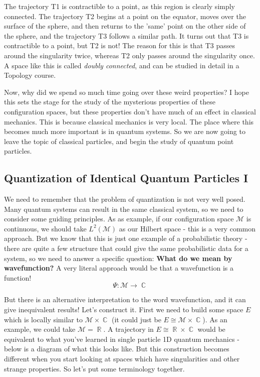 \documentclass{article}
\DeclareMathOperator{\RR}{\mathbb{R}}
\DeclareMathOperator{\CC}{\mathbb{C}}
\begin{document}
The trajectory T1 is contractible to a point, as this region is clearly simply connected. The trajectory T2 begins at a point on the equator, moves over the surface of the sphere, and then returns to the 'same' point on the other side of the sphere, and the trajectory T3 follows a similar path. It turns out that T3 is contractible to a point, but T2 is not! The reason for this is that T3 passes around the singularity twice, whereas T2 only passes around the singularity once. A space like this is called \textit{doubly connected}, and can be studied in detail in a Topology course. 

Now, why did we spend so much time going over these weird properties? I hope this sets the stage for the study of the mysterious properties of these configuration spaces, but these properties don't have much of an effect in classical mechanics. This is because classical mechanics is very local. The place where this becomes much more important is in quantum systems. So we are now going to leave the topic of classical particles, and begin the study of quantum point particles.

\subsection{Quantization of Identical Quantum Particles I}

We need to remember that the problem of quantization is not very well posed. Many quantum systems can result in the same classical system, so we need to consider some guiding principles. As as example, if our configuration space $\mathcal{M}$ is continuous, we should take $L^2(\mathcal{M})$ as our Hilbert space - this is a very common approach. But we know that this is just one example of a probabilistic theory - there are quite a few structure that could give the same probabilistic data for a system, so we need to answer a specific question: \textbf{What do we mean by wavefunction?} A very literal approach would be that a wavefunction is a function! 
\[\Psi: \mathcal{M} \to \CC\]

But there is an alternative interpretation to the word wavefunction, and it can give inequivalent results! Let's construct it. First we need to build some space $E$ which is locally similar to $\mathcal{M} \times \CC$ (it could just be $E \cong \mathcal{M}\times \CC$). As an example, we could take $\mathcal{M} = \RR$. A trajectory in $E \cong \RR \times \CC$ would be equivalent to what you've learned in single particle 1D quantum mechanics - below is a diagram of what this looks like. But this construction becomes different when you start looking at spaces which have singularities and other strange properties. So let's put some terminology together.
\end{document}
